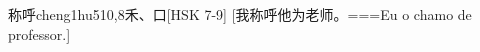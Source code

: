 \begin{EntryWithPhonetic}{称呼}{cheng1hu5}{10,8}{⽲、⼝}[HSK 7-9]
  [我称呼他为老师。===Eu o chamo de professor.]
\end{EntryWithPhonetic}
